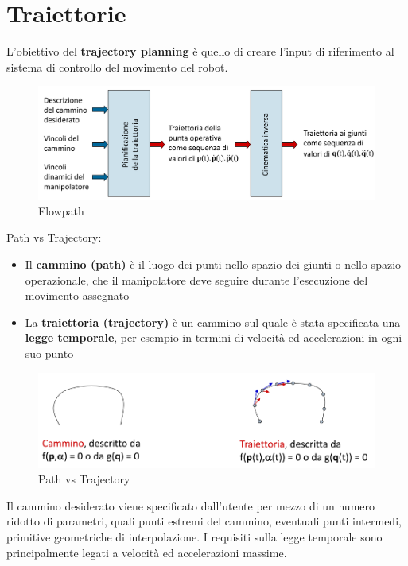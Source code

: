 \chapter{Traiettorie}

L'obiettivo del \textbf{trajectory planning} è quello di creare l'input di riferimento al sistema di controllo del movimento del robot. \\
\begin{figure}[H]
	\centering
	\includegraphics[width=0.9\linewidth]{images/trajectories_2}
	\caption{Flowpath}
	\label{fig:trajectories2}
\end{figure}

Path vs Trajectory:
\begin{itemize}
	\item Il \textbf{cammino (path)} è il luogo dei punti nello spazio dei giunti o nello spazio operazionale, che il manipolatore deve seguire durante l’esecuzione del movimento assegnato
	\item La \textbf{traiettoria (trajectory)} è un cammino sul quale è stata specificata una \textbf{legge temporale}, per esempio in termini di velocità ed accelerazioni in ogni suo punto
\end{itemize}

\begin{figure}[H]
	\centering
	\includegraphics[width=0.7\linewidth]{images/trajectories_1}
	\caption{Path vs Trajectory}
	\label{fig:trajectories1}
\end{figure}

Il cammino desiderato viene specificato dall’utente per mezzo di un numero ridotto di parametri, quali punti estremi del cammino, eventuali punti intermedi, primitive geometriche di interpolazione. I requisiti sulla legge temporale sono principalmente legati a velocità ed accelerazioni massime.

